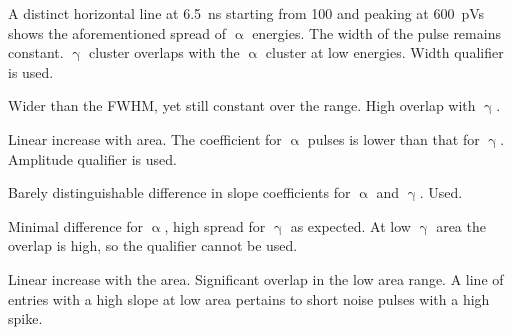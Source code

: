 \begin{description}
\setlength\itemsep{-0.3em}
\item[Width: ] A distinct horizontal line at 6.5~ns starting from 100 and peaking at 600~pVs shows the aforementioned spread of $\upalpha$ energies. The width of the pulse remains constant. $\upgamma$ cluster overlaps with the $\upalpha$ cluster at low energies. Width qualifier is used.
\item[Base width: ] Wider than the FWHM, yet still constant over the range. High overlap with $\upgamma$.
\item[Amplitude: ] Linear increase with area. The coefficient for $\upalpha$ pulses is lower than that for $\upgamma$. Amplitude qualifier is used.
\item[Calculated area: ] Barely distinguishable difference in slope coefficients for $\upalpha$ and $\upgamma$. Used.
\item[Base width -- width: ] Minimal difference for $\upalpha$, high spread for $\upgamma$ as expected. At low $\upgamma$ area the overlap is high, so the qualifier cannot be used.
\item[Slope: ] Linear increase with the area. Significant overlap in the low area range. A line of entries with a high slope at low area pertains to short noise pulses with a high spike.
\end{description}

